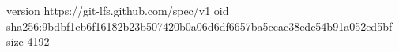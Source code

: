 version https://git-lfs.github.com/spec/v1
oid sha256:9bdbf1cb6f16182b23b507420b0a06d6df6657ba5ccac38cdc54b91a052ed5bf
size 4192
